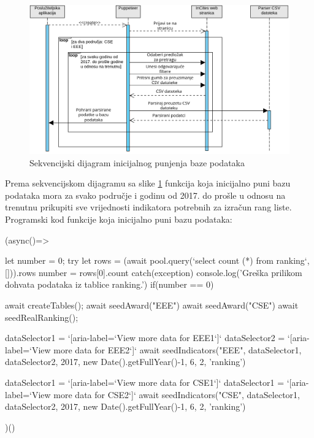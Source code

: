 \documentclass[times, utf8, zavrsni]{fer}
\begin{document}
           \FloatBarrier      
\begin{figure}[htb]
    \centering
       \includegraphics[scale=0.22]{sekvencijski.png} 
       \caption{Sekvencijski dijagram inicijalnog punjenja baze podataka}
       \label{fig:sekvencijski}
       \end{figure}
       \FloatBarrier
Prema sekvencijskom dijagramu sa slike \ref{fig:sekvencijski} funkcija koja inicijalno puni bazu podataka mora za svako područje i
godinu od 2017. do prošle u odnosu na trenutnu prikupiti sve vrijednosti indikatora potrebnih za izračun rang liste.  
\\Programski kod funkcije koja inicijalno puni bazu podataka:        
\begin{verbnobox}[\fontsize{10pt}{10pt}\selectfont]
(async()=>{
    let number = 0;
    try{
        let rows = (await pool.query(`select count (*) 
                        from ranking`, [])).rows
        number = rows[0].count
    } catch(exception){
        console.log('Greška prilikom dohvata podataka iz tablice ranking.')
    }
    if(number == 0){
        await createTables();
        await seedAward("EEE")
        await seedAward("CSE")
        await seedRealRanking();
            
        dataSelector1 = `[aria-label=`View more 
                                data for EEE1`]`
        dataSelector2 = `[aria-label=`View more 
                                data for EEE2`]`
        await seedIndicators("EEE", dataSelector1, 
                                dataSelector2, 2017, 
                                new Date().getFullYear()-1, 
                                6, 2, 'ranking')
    
        dataSelector1 = `[aria-label=`View more
                             data for CSE1`]`
        dataSelector1 = `[aria-label=`View more
                             data for CSE2`]`
        await seedIndicators("CSE", dataSelector1, 
                                dataSelector2, 2017, 
                                new Date().getFullYear()-1,
                                6, 2, 'ranking')
    }
})()
\end{verbnobox}  
\end{document}
